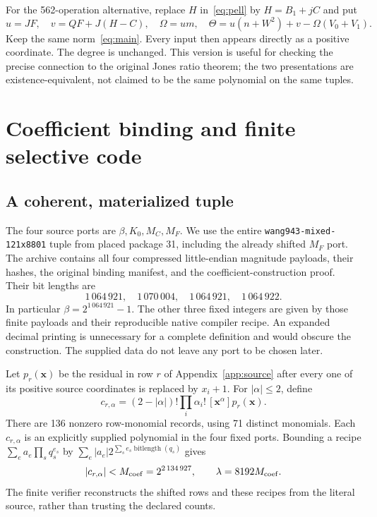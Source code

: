 \documentclass[11pt]{article}
\theoremstyle{remark}\newtheorem{remark}[theorem]{Remark}
\begin{document}
For the 562-operation alternative, replace $H$ in~\eqref{eq:pell} by
$H=B_1+jC$ and put
\[
 u=JF,\quad v=QF+J(H-C),\quad
 \Omega=um,\quad \Theta=u(n+W^2)+v-\Omega(V_0+V_1).
\]
Keep the same norm~\eqref{eq:main}. Every input then appears directly as
a positive coordinate. The degree is unchanged. This version is useful
for checking the precise connection to the original Jones ratio theorem;
the two presentations are existence-equivalent, not claimed to be the
same polynomial on the same tuples.

\section{Coefficient binding and finite selective code}\label{sec:coefficients}

\subsection{A coherent, materialized tuple}

The four source ports are $\beta,K_0,M_C,M_F$. We use the entire
\texttt{wang943-mixed-121x8801} tuple from placed package 31, including
the already shifted $M_F$ port. The archive contains all four compressed
little-endian magnitude payloads, their hashes, the original binding
manifest, and the coefficient-construction proof. Their bit lengths are
\[
 1\,064\,921,\quad1\,070\,004,\quad1\,064\,921,\quad1\,064\,922.
\]
In particular $\beta=2^{1\,064\,921}-1$. The other three fixed integers
are given by those finite payloads and their reproducible native compiler
recipe. An expanded decimal printing is unnecessary for a complete
definition and would obscure the construction. The supplied data do not
leave any port to be chosen later.

Let $p_r(\mathbf x)$ be the residual in row $r$ of Appendix~\ref{app:source}
after every one of its positive source coordinates is replaced by $x_i+1$.
For $|\alpha|\leq2$, define
\[
 c_{r,\alpha}=(2-|\alpha|)!\prod_i\alpha_i!\,
                   [\mathbf x^\alpha]p_r(\mathbf x).
\]
There are 136 nonzero row-monomial records, using 71 distinct monomials.
Each $c_{r,\alpha}$ is an explicitly supplied polynomial in the four fixed
ports. Bounding a recipe $\sum_e a_e\prod_s q_s^{e_s}$ by
$\sum_e|a_e|2^{\sum_s e_s\operatorname{bitlength}(q_s)}$ gives
\[
 |c_{r,\alpha}|<M_{\rm coef}=2^{2\,134\,927},
 \qquad \lambda=8192M_{\rm coef}.
\]
The finite verifier reconstructs the shifted rows and these recipes from
the literal source, rather than trusting the declared counts.
\end{document}
